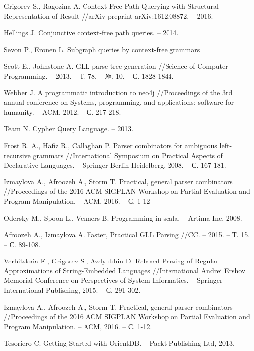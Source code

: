 \begin{thebibliography}{99}

  Grigorev S., Ragozina A. Context-Free Path Querying with Structural Representation of Result //arXiv preprint arXiv:1612.08872. – 2016.

  Hellings J. Conjunctive context-free path queries. – 2014. 

  Sevon P., Eronen L. Subgraph queries by context-free grammars

  Scott E., Johnstone A. GLL parse-tree generation //Science of
Computer Programming. – 2013. – Т. 78. – №. 10. – С. 1828-1844. 

Webber J. A programmatic introduction to neo4j //Proceedings of the
3rd annual conference on Systems, programming, and applications: software
for humanity. – ACM, 2012. – С. 217-218.

Team N. Cypher Query Language. – 2013. 

Frost R. A., Hafiz R., Callaghan P. Parser combinators for
ambiguous left-recursive grammars //International Symposium on Practical
Aspects of Declarative Languages. – Springer Berlin Heidelberg, 2008. – С.
167-181.

Izmaylova A., Afroozeh A., Storm T. Practical, general parser
combinators //Proceedings of the 2016 ACM SIGPLAN Workshop on
Partial Evaluation and Program Manipulation. – ACM, 2016. – С. 1-12

Odersky M., Spoon L., Venners B. Programming in scala. – Artima
Inc, 2008. 

Afroozeh A., Izmaylova A. Faster, Practical GLL Parsing //CC. –
2015. – Т. 15. – С. 89-108. 

Verbitskaia E., Grigorev S., Avdyukhin D. Relaxed Parsing of
Regular Approximations of String-Embedded Languages //International
Andrei Ershov Memorial Conference on Perspectives of System Informatics.
– Springer International Publishing, 2015. – С. 291-302. 

Izmaylova A., Afroozeh A., Storm T. Practical, general parser
combinators //Proceedings of the 2016 ACM SIGPLAN Workshop on
Partial Evaluation and Program Manipulation. – ACM, 2016. – С. 1-12.

Tesoriero C. Getting Started with OrientDB. – Packt Publishing Ltd,
2013. 


\end{thebibliography}
